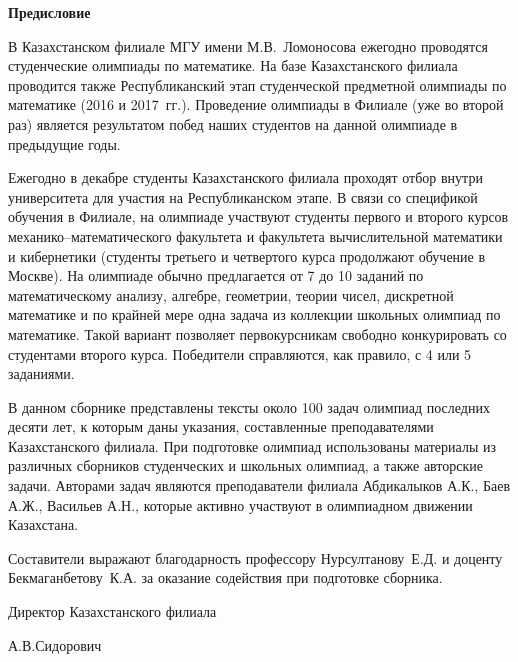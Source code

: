 \documentclass[12pt, a5paper]{article}
\begin{document}
\newpage
\begin{small}
\begin{center}
\textbf{Предисловие}
\end{center}
В Казахстанском филиале  МГУ имени М.В.~Ломоносова ежегодно проводятся студенческие олимпиады по математике. На базе Казахстанского филиала проводится также Республиканский этап студенческой предметной олимпиады по математике (2016 и 2017~гг.). Проведение олимпиады в Филиале (уже во второй раз) является результатом побед наших студентов на данной олимпиаде в предыдущие годы.

Ежегодно в декабре студенты Казахстанского филиала проходят отбор внутри университета для участия на Республиканском этапе. В связи со спецификой обучения в Филиале, на олимпиаде участвуют студенты первого и второго курсов механико--математического факультета и факультета вычислительной математики и кибернетики (студенты третьего и четвертого курса продолжают обучение в Москве). На олимпиаде обычно предлагается от 7 до 10 заданий по математическому анализу, алгебре, геометрии, теории чисел, дискретной математике и по крайней мере одна задача из коллекции школьных олимпиад по математике. Такой вариант позволяет первокурсникам свободно конкурировать со студентами второго курса. Победители справляются, как правило, с 4 или 5 заданиями.

В данном сборнике представлены тексты около 100 задач олимпиад последних десяти лет, к которым даны указания, составленные преподавателями Казахстанского филиала. При подготовке олимпиад использованы материалы из различных сборников студенческих и школьных олимпиад, а также авторские задачи. Авторами задач являются преподаватели филиала Абдикалыков А.К., Баев А.Ж., Васильев А.Н., которые активно участвуют в олимпиадном движении Казахстана. 

Составители выражают благодарность профессору  Нурсултанову~Е.Д. и доценту Бекмаганбетову~К.А. за оказание содействия при подготовке сборника.

\begin{flushright}
Директор Казахстанского филиала

А.В.Сидорович
\end{flushright}
\end{small}

\newpage

\mbox{}

\newpage
\pagestyle{headings}

\tableofcontents

\newpage
\end{document}
